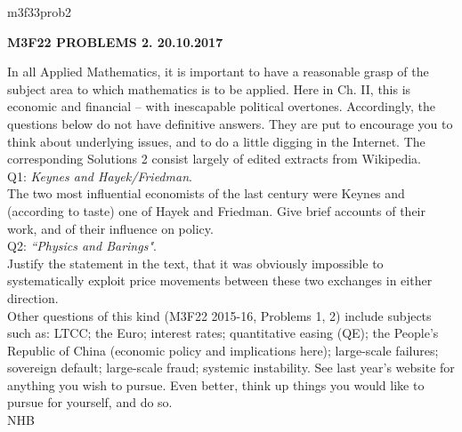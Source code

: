 \documentclass[12pt]{article}
\begin{document}
\def\R{\mathbb{R}}
\def\C{\mathbb{C}}
\def\Z{\mathbb{Z}}
\def\N{\mathbb{N}}
\def\Q{\mathbb{Q}}
\def\D{\mathbb{D}}
\def\Sp{{\mathbb{S}}}
\def\T{\mathbb{T}}
\def\H{\mathbb{H}}
\def\hb{\hfil \break}
\def\ni{\noindent}
\def\i{\indent}
\def\a{\alpha}
\def\b{\beta}
\def\e{\epsilon}
\def\d{\delta}
\def\D{\Delta}
\def\G{\Gamma}
\def\g{\gamma}
\def\l{\lambda}
\def\m{\mu}
\def\s{\sigma}
\def\Si{\Sigma}
\def\th{\theta}
\def\z{\zeta}
\def\p{\partial}
\def\o{\omega}
\def\O{\Omega}
\def\t{\tau}
\def\L{\it \char'44}
\def\F{\mathcal{F}}
\def\B{\mathcal{B}}
\def\C{\mathcal{C}}
\def\half{\frac{1}{2}}
\ni m3f33prob2 \\
\begin{center}
{\bf M3F22 PROBLEMS 2.  20.10.2017} 
\end{center}
\i In all Applied Mathematics, it is important to have a reasonable grasp of the subject area to which mathematics is to be applied.  Here in Ch. II, this is economic and financial -- with inescapable political overtones.  Accordingly, the questions below do not have definitive answers.  They are put to encourage you to think about underlying issues, and to do a little digging in the Internet.  The corresponding Solutions 2 consist largely of edited extracts from Wikipedia. \\

\ni Q1: {\it Keynes and Hayek/Friedman}. \\  
\i The two most influential economists of the last century were Keynes and (according to taste) one of Hayek and Friedman.  Give brief accounts of their work, and of their influence on policy. \\

\ni Q2: {\it ``Physics and Barings"}.  \\
\i Justify the statement in the text, that it was obviously impossible to systematically exploit price movements
between these two exchanges in either direction. \\

\i Other questions of this kind (M3F22 2015-16, Problems 1, 2) include subjects such as: LTCC; the Euro; interest rates; quantitative easing (QE); the People's Republic of China (economic policy and implications here); large-scale failures; sovereign default; large-scale fraud; systemic instability.  See last year's website for anything you wish to pursue.  Even better, think up things you would like to pursue for yourself, and do so. \\

\hfil NHB \break
\end{document}
